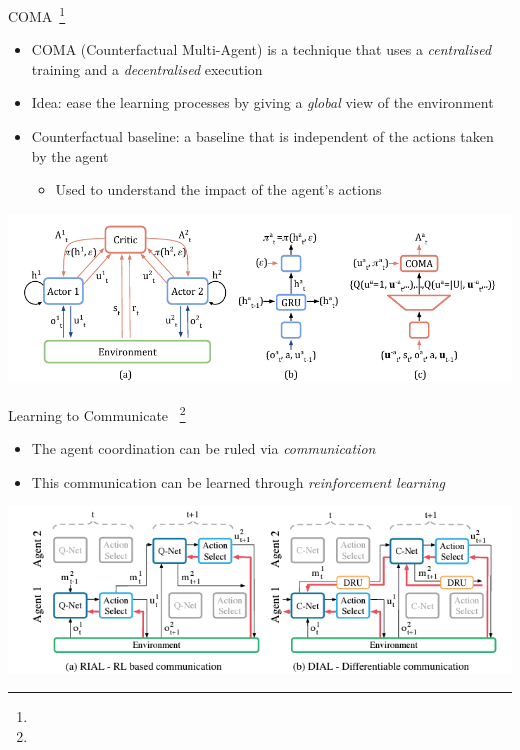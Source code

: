 \documentclass[presentation, 8pt]{beamer}\mode<presentation>{\usetheme{AMSBolognaFC}}
\begin{document}
\begin{frame}{COMA~\footnote[frame]{}}
	\begin{itemize}
		\item COMA (Counterfactual Multi-Agent) is a technique that uses a \emph{centralised} training and a \emph{decentralised} execution
		\item Idea: ease the learning processes by giving a \emph{global} view of the environment 
		\item Counterfactual baseline: a baseline that is independent of the actions taken by the agent
		\begin{itemize}
			\item Used to understand the impact of the agent's actions
		\end{itemize}
	\end{itemize}
	\includegraphics[width=\textwidth]{img/coma.png}
\end{frame}
\begin{frame}{Learning to Communicate ~\footnote[frame]{}}
	\begin{itemize}
		\item The agent coordination can be ruled via \emph{communication}
		\item This communication can be learned through \emph{reinforcement learning}
	\end{itemize}
	\centering
	\includegraphics[width=\textwidth]{img/learning-to-communicate.png}
\end{frame}
\end{document}
